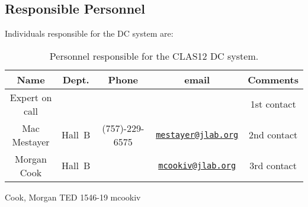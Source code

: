 \subsection{Responsible Personnel}

Individuals responsible for the DC system are:

\begin{table}[!htb]
\centering
\begin{tabular}{|c|c|c|c|c|} \hline
Name &Dept.&Phone&email&Comments \\ \hline
Expert on call &       &       &       & 1st contact \\ \hline
Mac Mestayer&Hall~B&(757)-229-6575& \href{mailto:mestayer@jlab.org}{\nolinkurl{mestayer@jlab.org}} &  2nd contact\\ \hline
Morgan Cook&Hall~B&  & \href{mailto:mcookiv@jlab.org}{\nolinkurl{mcookiv@jlab.org}} & 3rd contact\\ \hline

 \end{tabular}
\caption{Personnel responsible for the CLAS12 DC system.} 
\label{tb:dc}
\end{table}

Cook, Morgan	TED 1546-19	 	mcookiv

